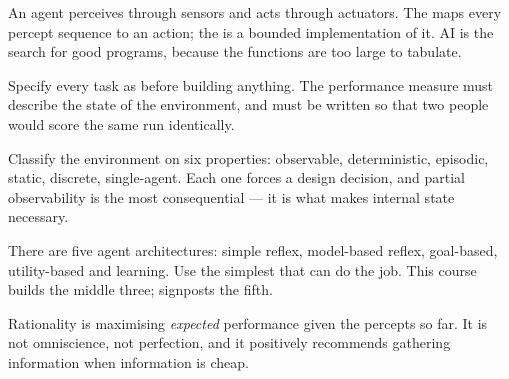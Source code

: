 \begin{chaptersummary}
\begin{tight}
  \item An agent perceives through sensors and acts through actuators. The
         maps every percept sequence to an action; the
         is a bounded implementation of it. AI is the search
        for good programs, because the functions are too large to tabulate.
  \item Specify every task as  before building anything. The
        performance measure must describe the state of the environment, and must
        be written so that two people would score the same run identically.
  \item Classify the environment on six properties: observable, deterministic,
        episodic, static, discrete, single-agent. Each one forces a design
        decision, and partial observability is the most consequential --- it is
        what makes internal state necessary.
  \item There are five agent architectures: simple reflex, model-based reflex,
        goal-based, utility-based and learning. Use the simplest that can do the
        job. This course builds the middle three;  signposts the
        fifth.
  \item Rationality is maximising \emph{expected} performance given the percepts
        so far. It is not omniscience, not perfection, and it positively
        recommends gathering information when information is cheap.
\end{tight}
\end{chaptersummary}

